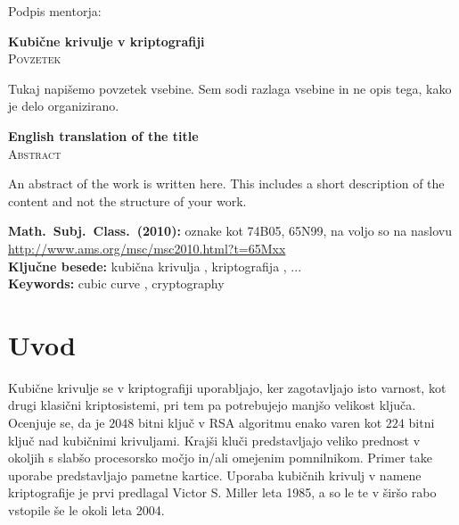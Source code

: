 \documentclass[12pt,a4paper,twoside]{article}
\newcommand{\naslovdela}{Kubične krivulje v kriptografiji}
\newcommand{\kljucnebesede}{kubična krivulja \sep kriptografija \sep ...} %
\newcommand{\keywords}{cubic curve \sep cryptography} %
\newcommand{\sep}{, }  %
\theoremstyle{definition} %
\theoremstyle{plain} %
\numberwithin{equation}{section}  %
\begin{document}
\vspace{2cm}
\hspace*{\fill} Podpis mentorja: \phantom{prostor za podpis}


\cleardoublepage
{}

\begin{center}
\textbf{\naslovdela} \\[3mm]
\textsc{Povzetek} \\[2mm]
\end{center}
Tukaj napišemo povzetek vsebine. Sem sodi razlaga vsebine in ne opis tega, kako je delo
organizirano.

\vfill
\begin{center}
\textbf{English translation of the title} \\[3mm] %
\textsc{Abstract}\\[2mm]
\end{center}

An abstract of the work is written here. This includes a short description of
the content and not the structure of your work.

\vfill\noindent
\textbf{Math.~Subj.~Class.~(2010):} oznake kot 74B05, 65N99, na voljo so na naslovu
\url{http://www.ams.org/msc/msc2010.html?t=65Mxx} \\[1mm]
\textbf{Ključne besede:} \kljucnebesede \\[1mm]
\textbf{Keywords:} \keywords

\cleardoublepage

\setcounter{page}{1}    %



\section{Uvod}
Kubične krivulje se v kriptografiji uporabljajo, ker zagotavljajo isto varnost, kot drugi klasični kriptosistemi, pri tem pa potrebujejo manjšo velikost ključa. Ocenjuje se, da je $2048$ bitni ključ v RSA algoritmu enako varen kot $224$ bitni ključ nad kubičnimi krivuljami. Krajši kluči predstavljajo veliko prednost v okoljih s slabšo procesorsko močjo in/ali omejenim pomnilnikom. Primer take uporabe predstavljajo pametne kartice. Uporaba kubičnih krivulj v namene kriptografije je prvi predlagal Victor S. Miller leta 1985, a so le te v širšo rabo vstopile še le okoli leta 2004.
\end{document}
